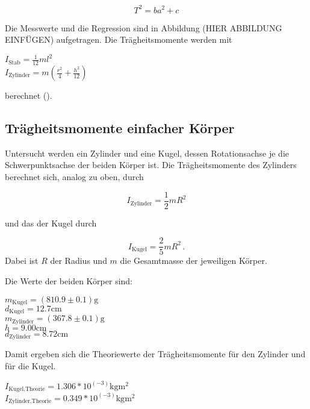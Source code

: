 \begin{equation}
  \label{eqn:linReg}
  T^2 = ba^2+c
\end{equation}

Die Messwerte und die Regression sind in Abbildung (HIER ABBILDUNG EINFÜGEN) aufgetragen. Die Trägheitsmomente werden mit
\begin{center}
  $I_{\text{Stab}} = \frac{1}{12} ml^2 $ \\
  $I_{\text{Zylinder}} = m (\frac{r^2}{4} +\frac{h^2}{12}) $ \\
\end{center}
berechnet (\cite{Anleitung}). 

\subsection{Trägheitsmomente einfacher Körper}
\label{sec:Trägheitsmomente einfacher Körper}

Untersucht werden ein Zylinder und eine Kugel, dessen Rotationsachse je die Schwerpunktsachse der beiden Körper ist.
Die Trägheitsmomente des Zylinders berechnet sich, analog zu oben, durch

\begin{equation}
  I_{\text{Zylinder}} = \frac{1}{2} mR^2
\end{equation}

und das der Kugel durch

\begin{equation}
  I_{\text{Kugel}} = \frac{2}{5} mR^2 \, .
\end{equation}
Dabei ist $R$ der Radius und $m$ die Gesamtmasse der jeweiligen Körper.

Die Werte der beiden Körper sind:
\begin{center}
  $m_{\text{Kugel}} = (810.9 \pm 0.1)\si{\gram}$ \\
  $d_{\text{Kugel}} = 12.7\si{\centi\meter}$ \\
  $m_{\text{Zylinder}} = (367.8\pm 0.1)\si{\gram}$ \\
  $h = 9.00 \si{\centi\meter}$ \\
  $d_{\text{Zylinder}} = 8.72 \si{\centi\meter}$ \\
\end{center}

Damit ergeben sich die Theoriewerte der Trägheitsmomente für den Zylinder und für die Kugel.

\begin{center}
  $I_{\text{Kugel,Theorie}} = 1.306 *10^(-3) \si{\kilogram\meter^2}$ \\
  $I_{\text{Zylinder,Theorie}} = 0.349 *10^(-3) \si{\kilogram\meter^2}$ \\
\end{center}

